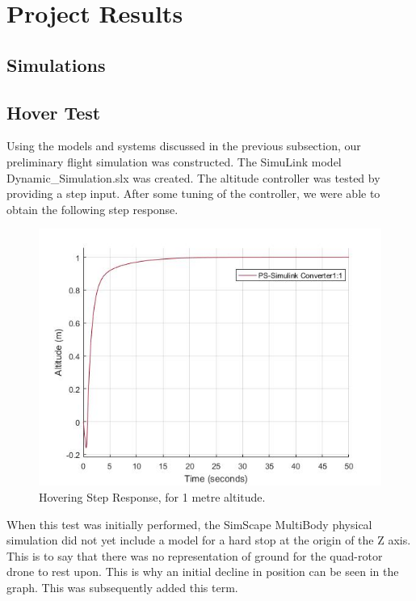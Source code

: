 
\section{Project Results}

\subsection{Simulations}
\subsection{Hover Test}
Using the models and systems discussed in the previous subsection, our preliminary flight simulation was constructed.  The SimuLink model Dynamic\_Simulation.slx was created.  The altitude controller was tested by providing a step input.  After some tuning of the controller, we were able to obtain the following step response.

\begin{figure}[h]
	\centering
	\includegraphics[scale = 0.5]{stepresponse.jpg}
	\caption{Hovering Step Response, for 1 metre altitude.}
	\label{fig:1m_step}
\end{figure}

When this test was initially performed, the SimScape MultiBody physical simulation did not yet include a model for a hard stop at the origin of the Z axis.  This is to say that there was no representation of ground for the quad-rotor drone to rest upon.  This is why an initial decline in position can be seen in the graph.  This was subsequently added this term.


